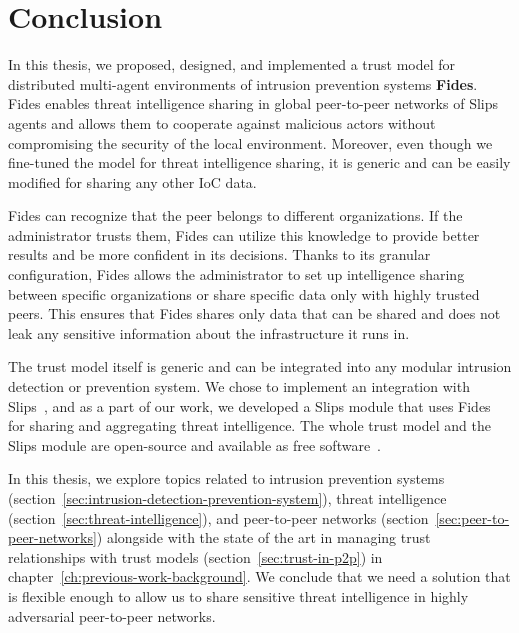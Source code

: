 \chapter{Conclusion}
\label{ch:conclusion}

In this thesis, we proposed, designed, and implemented a trust model for distributed multi-agent environments of intrusion prevention systems \textbf{Fides}.
Fides enables threat intelligence sharing in global peer-to-peer networks of Slips agents and allows them to cooperate against malicious actors without compromising the security of the local environment. 
Moreover, even though we fine-tuned the model for threat intelligence sharing, it is generic and can be easily modified for sharing any other IoC data.

Fides can recognize that the peer belongs to different organizations. If the administrator trusts them, Fides can utilize this knowledge to provide better results and be more confident in its decisions.
Thanks to its granular configuration, Fides allows the administrator to set up intelligence sharing between specific organizations or share specific data only with highly trusted peers.
This ensures that Fides shares only data that can be shared and does not leak any sensitive information about the infrastructure it runs in.

The trust model itself is generic and can be integrated into any modular intrusion detection or prevention system. We chose to implement an integration with Slips~\cite{slips}, and as a part of our work, we developed a Slips module that uses Fides for sharing and aggregating threat intelligence.
The whole trust model and the Slips module are open-source and available as free software~\cite{fidesGithub}.

In this thesis, we explore topics related to intrusion prevention systems (section~\ref{sec:intrusion-detection-prevention-system}), threat intelligence (section~\ref{sec:threat-intelligence}), and peer-to-peer networks (section~\ref{sec:peer-to-peer-networks}) alongside with the state of the art in managing trust relationships with trust models (section~\ref{sec:trust-in-p2p}) in chapter~\ref{ch:previous-work-background}.
We conclude that we need a solution that is flexible enough to allow us to share sensitive threat intelligence in highly adversarial peer-to-peer networks.

